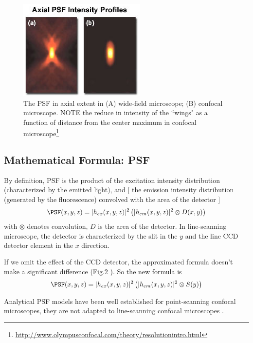 \begin{figure}[hbt]
  \centerline{\includegraphics[height=5cm,
    angle=0]{./images/microscope_axial_extent.eps}}
  \caption{The PSF in axial extent in (A) wide-field microscope; (B) confocal
  microscope. NOTE the reduce in intensity of the ``wings" as a function of
  distance from the center maximum in confocal
  microscope\footnote{\url{http://www.olympusconfocal.com/theory/resolutionintro.html}}}
  \label{fig:axial_PSF}
\end{figure}



\subsection{Mathematical Formula: PSF}

By definition, PSF is the product of the excitation intensity distribution
(characterized by the emitted light), and [ the emission intensity
distribution (generated by the fluorescence) convolved with the area of
the detector ]
\begin{equation}
\PSF (x,y,z) = |h_{ex}(x,y,z)|^2 \left( |h_{em}(x,y,z)|^2 \otimes D(x,y) \right)
\end{equation}
with $\otimes$ denotes convolution, $D$ is the area of the detector. In
line-scanning microscope, the detector is characterized by the slit in the $y$
and the line CCD detector element in the $x$ direction. 

If we omit the effect of the CCD detector, the approximated formula doesn't make
a significant difference (Fig.2 \citep{dusch2007}). So the new formula is
\begin{equation}
\PSF (x,y,z) = |h_{ex}(x,y,z)|^2 \left( |h_{em}(x,y,z)|^2 \otimes S(y) \right)
\end{equation}

Analytical PSF models have been well established for point-scanning confocal
microscopes, they are not adapted to line-scanning confocal microscopes
\citep{dusch2007}.

